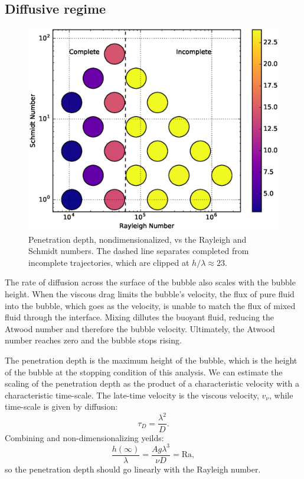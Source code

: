 \subsection{Diffusive regime}
\begin{figure}
\includegraphics[width=\columnwidth]{figs/PenetrationDepth-vs-Rayleigh-Schmidt}
\caption{ 
  Penetration depth, nondimensionalized, vs the Rayleigh and Schmidt numbers.
  The dashed line separates completed from incomplete trajectories, which are clipped at $h/\lambda \approx 23$.
}
\end{figure}

The rate of diffusion across the surface of the bubble also scales with the bubble height.
When the viscous drag limits the bubble's velocity, the flux of pure fluid into the bubble, which goes as the velocity, is unable to match the flux of mixed fluid through the interface.
Mixing dillutes the buoyant fluid, reducing the Atwood number and therefore the bubble velocity.
Ultimately, the Atwood number reaches zero and the bubble stops rising.

The penetration depth is the maximum height of the bubble, which is the height of the bubble at the stopping condition of this analysis.
We can estimate the scaling of the penetration depth as the product of a characteristic velocity with a characteristic time-scale.
The late-time velocity is the viscous velocity, $v_\nu$, while time-scale is given by diffusion:
\begin{equation}
\tau_D = \frac{\lambda^2}{D}.
\end{equation}
Combining and non-dimensionalizing yeilds:
\begin{equation}
\frac{h(\infty)}{\lambda} = \frac{A g \lambda^3}{\nu D} = \text{Ra},
\end{equation}
so the penetration depth should go linearly with the Rayleigh number.

